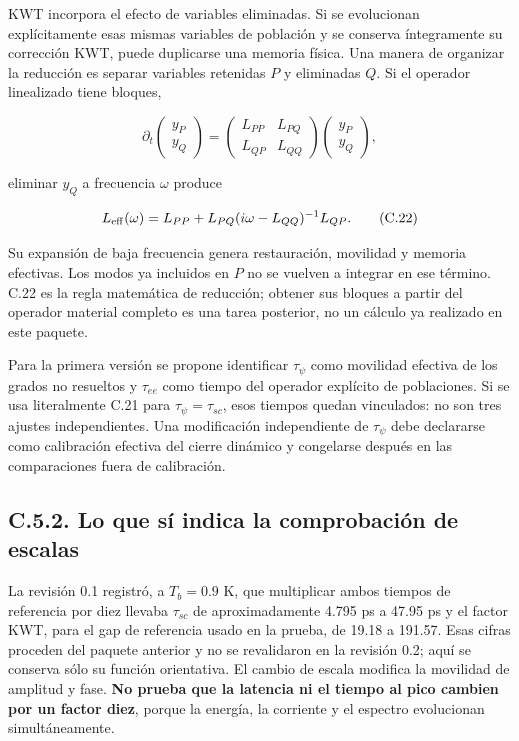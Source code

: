 \documentclass[
  spanish,
  10pt,
  a4paper,
]{article}
\begin{document}
KWT incorpora el efecto de variables eliminadas. Si se evolucionan
explícitamente esas mismas variables de población y se conserva
íntegramente su corrección KWT, puede duplicarse una memoria física. Una
manera de organizar la reducción es separar variables retenidas \(P\) y
eliminadas \(Q\). Si el operador linealizado tiene bloques,

\[
\partial_t\begin{pmatrix}y_P\\y_Q\end{pmatrix}
=\begin{pmatrix}L_{PP}&L_{PQ}\\L_{QP}&L_{QQ}\end{pmatrix}
\begin{pmatrix}y_P\\y_Q\end{pmatrix},
\]

eliminar \(y_Q\) a frecuencia \(\omega\) produce

\[
L_{\rm eff}(\omega)=L_{PP}
+L_{PQ}(i\omega-L_{QQ})^{-1}L_{QP}. \tag{C.22}
\]

Su expansión de baja frecuencia genera restauración, movilidad y memoria
efectivas. Los modos ya incluidos en \(P\) no se vuelven a integrar en
ese término. C.22 es la regla matemática de reducción; obtener sus
bloques a partir del operador material completo es una tarea posterior,
no un cálculo ya realizado en este paquete.

Para la primera versión se propone identificar \(\tau_\psi\) como
movilidad efectiva de los grados no resueltos y \(\tau_{ee}\) como
tiempo del operador explícito de poblaciones. Si se usa literalmente
C.21 para \(\tau_\psi=\tau_{sc}\), esos tiempos quedan vinculados: no
son tres ajustes independientes. Una modificación independiente de
\(\tau_\psi\) debe declararse como calibración efectiva del cierre
dinámico y congelarse después en las comparaciones fuera de calibración.

\subsection{C.5.2. Lo que sí indica la comprobación de
escalas}\label{c.5.2.-lo-que-suxed-indica-la-comprobaciuxf3n-de-escalas}

La revisión 0.1 registró, a \(T_b=0.9\) K, que multiplicar ambos tiempos
de referencia por diez llevaba \(\tau_{sc}\) de aproximadamente 4.795 ps
a 47.95 ps y el factor KWT, para el gap de referencia usado en la
prueba, de 19.18 a 191.57. Esas cifras proceden del paquete anterior y
no se revalidaron en la revisión 0.2; aquí se conserva sólo su función
orientativa. El cambio de escala modifica la movilidad de amplitud y
fase. \textbf{No prueba que la latencia ni el tiempo al pico cambien por
un factor diez}, porque la energía, la corriente y el espectro
evolucionan simultáneamente.
\end{document}
